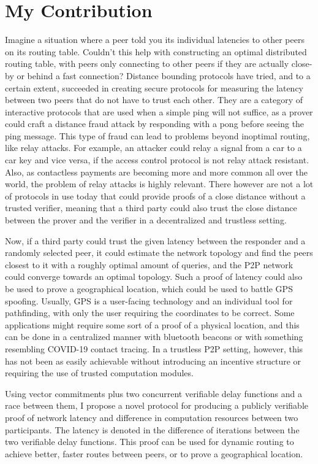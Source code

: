 \section{My Contribution}
Imagine a situation where a peer told you its individual latencies to other peers on its routing table. Couldn't this help with constructing an optimal distributed routing table, with peers only connecting to other peers if they are actually close-by or behind a fast connection? Distance bounding protocols have tried, and to a certain extent, succeeded in creating secure protocols for measuring the latency between two peers that do not have to trust each other. They are a category of interactive protocols that are used when a simple ping will not suffice, as a prover could craft a distance fraud attack by responding with a pong before seeing the ping message. This type of fraud can lead to problems beyond inoptimal routing, like relay attacks. For example, an attacker could relay a signal from a car to a car key and vice versa, if the access control protocol is not relay attack resistant. Also, as contactless payments are becoming more and more common all over the world, the problem of relay attacks is highly relevant. There however are not a lot of protocols in use today that could provide proofs of a close distance without a trusted verifier, meaning that a third party could also trust the close distance between the prover and the verifier in a decentralized and trustless setting.\cite{Maram_undated-it}

Now, if a third party could trust the given latency between the responder and a randomly selected peer, it could estimate the network topology and find the peers closest to it with a roughly optimal amount of queries, and the P2P network could converge towards an optimal topology. Such a proof of latency could also be used to prove a geographical location, which could be used to battle GPS spoofing. Usually, GPS is a user-facing technology and an individual tool for pathfinding, with only the user requiring the coordinates to be correct. Some applications might require some sort of a proof of a physical location, and this can be done in a centralized manner with bluetooth beacons or with something resembling COVID-19 contact tracing. In a trustless P2P setting, however, this has not been as easily achievable without introducing an incentive structure or requiring the use of trusted computation modules.

Using vector commitments plus two concurrent verifiable delay functions and a race between them, I propose a novel protocol for producing a publicly verifiable proof of network latency and difference in computation resources between two participants. The latency is denoted in the difference of iterations between the two verifiable delay functions. This proof can be used for dynamic routing to achieve better, faster routes between peers, or to prove a geographical location.


